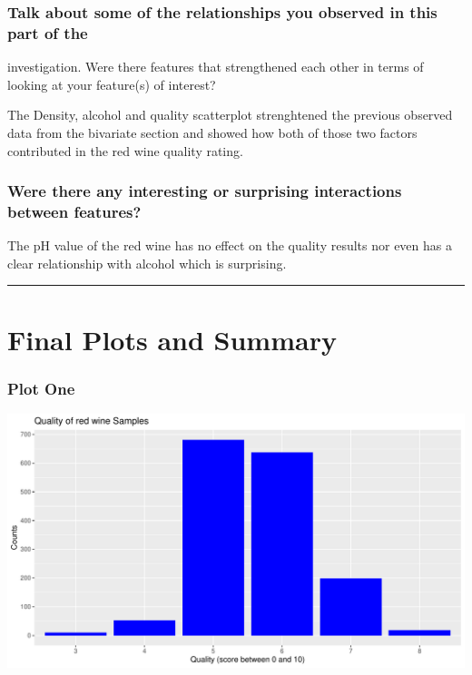 \documentclass[]{article}
\begin{document}
\hypertarget{talk-about-some-of-the-relationships-you-observed-in-this-part-of-the-1}{%
\subsubsection{\texorpdfstring{Talk about some of the relationships you
observed in this part of the\\
}{Talk about some of the relationships you observed in this part of the }}\label{talk-about-some-of-the-relationships-you-observed-in-this-part-of-the-1}}

investigation. Were there features that strengthened each other in terms
of\\
looking at your feature(s) of interest?

The Density, alcohol and quality scatterplot strenghtened the previous
observed data from the bivariate section and showed how both of those
two factors contributed in the red wine quality rating.

\hypertarget{were-there-any-interesting-or-surprising-interactions-between-features}{%
\subsubsection{Were there any interesting or surprising interactions
between
features?}\label{were-there-any-interesting-or-surprising-interactions-between-features}}

The pH value of the red wine has no effect on the quality results nor
even has a clear relationship with alcohol which is surprising.

\begin{center}\rule{0.5\linewidth}{\linethickness}\end{center}

\hypertarget{final-plots-and-summary}{%
\section{Final Plots and Summary}\label{final-plots-and-summary}}

\hypertarget{plot-one}{%
\subsubsection{Plot One}\label{plot-one}}

\begin{center}\includegraphics{Figs/Plot_One-1} \end{center}
\end{document}
